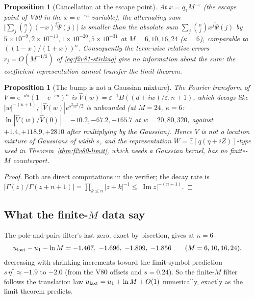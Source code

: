 \documentclass[11pt]{article}
\newtheorem{proposition}[theorem]{Proposition}
\theoremstyle{definition}
\theoremstyle{remark}
\begin{document}
\begin{proposition}[Cancellation at the escape point]
\label{prop:f2v81-cancel}
At \(x=q_1M^{-\varepsilon}\) (the escape point of V80 in the \(x=e^{-\varepsilon u}\)
variable), the alternating sum \(\bigl|\sum_j\binom nj(-x)^j\widetilde\Psi(j)\bigr|\)
is smaller than the absolute sum \(\sum_j\binom njx^j\widetilde\Psi(j)\) by
\(5\times10^{-9},2\times10^{-13},1\times10^{-20},5\times10^{-31}\) at
\(M=6,10,16,24\) (\(\kappa=6\)), comparable to \(((1-x)/(1+x))^n\).
Consequently the term-wise relative errors \(r_j=O(M^{-1/2})\) of
\eqref{eq:f2v81-stirling} give no information about the sum: the
coefficient representation cannot transfer the limit theorem.
\end{proposition}

\begin{proposition}[The bump is not a Gaussian mixture]
\label{prop:f2v81-mixture}
The Fourier transform of \(V=e^{-du}(1-e^{-\varepsilon u})^n\) is
\(\widehat V(w)=\varepsilon^{-1}B((d+iw)/\varepsilon,n+1)\), which decays like
\(|w|^{-(n+1)}\); \(|\widehat V(w)|e^{s^2w^2/2}\) is unbounded (at
\(M=24\), \(\kappa=6\): \(\ln|\widehat V(w)/\widehat V(0)|=-10.2,-67.2,-165.7\)
at \(w=20,80,320\), against \(+1.4,+118.9,+2810\) after multiplying by
the Gaussian).  Hence \(V\) is not a location mixture of Gaussians of
width \(s\), and the representation \(W=\mathbb E[q(\eta+iZ)]\)-type used
in Theorem~\ref{thm:f2v80-limit}, which needs a Gaussian kernel, has no
finite-\(M\) counterpart.
\end{proposition}

\begin{proof}
Both are direct computations in the verifier; the decay rate is
\(|\Gamma(z)/\Gamma(z+n+1)|=\prod_{k\le n}|z+k|^{-1}\le|\operatorname{Im}z|^{-(n+1)}\).
\end{proof}

\subsection{What the finite-\(M\) data say}

The pole-and-pairs filter's last zero, exact by bisection, gives at
\(\kappa=6\)
\begin{equation}
 u_{\rm last}-u_1-\ln M=-1.467,\;-1.696,\;-1.809,\;-1.856\qquad(M=6,10,16,24),
 \label{eq:f2v81-offset}
\end{equation}
decreasing with shrinking increments toward the limit-symbol prediction
\(s\,\eta^*\approx-1.9\) to \(-2.0\) (from the V80 offsets and
\(s=0.24\)).  So the finite-\(M\) filter follows the translation law
\(u_{\rm last}=u_1+\ln M+O(1)\) numerically, exactly as the limit
theorem predicts.
\end{document}
